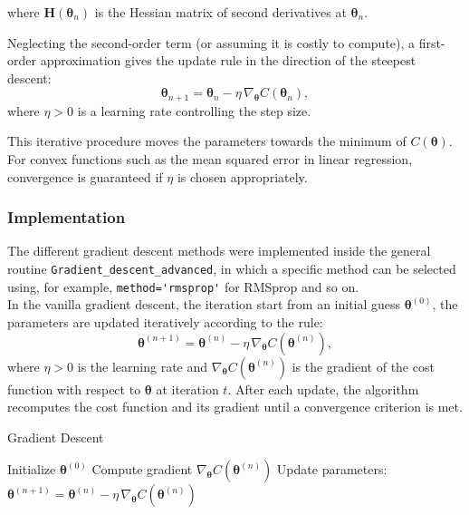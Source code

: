 \documentclass[
 reprint,            %
 amsmath,amssymb,
 aps,
]{revtex4-2}
\begin{document}
where $\mathbf{H}(\boldsymbol{\theta}_n)$ is the Hessian matrix of second derivatives at $\boldsymbol{\theta}_n$.

Neglecting the second-order term (or assuming it is costly to compute), a first-order approximation gives the update rule in the direction of the steepest descent:
\[
\boldsymbol{\theta}_{n+1} = \boldsymbol{\theta}_n - \eta \, \nabla_{\boldsymbol{\theta}} C(\boldsymbol{\theta}_n),
\]
where $\eta > 0$ is a learning rate controlling the step size.  

This iterative procedure moves the parameters towards the minimum of $C(\boldsymbol{\theta})$.
For convex functions such as the mean squared error in linear regression, convergence is guaranteed if $\eta$ is chosen appropriately.

\subsubsection{Implementation}
The different gradient descent methods were implemented inside the general routine \verb|Gradient_descent_advanced|, in which a specific method can be selected using, for example, \verb|method='rmsprop'| for RMSprop and so on. \\
In the vanilla gradient descent, the iteration start from an initial guess $\boldsymbol{\theta}^{(0)}$, the parameters are updated iteratively according to the rule:
\[
\boldsymbol{\theta}^{(n+1)} = \boldsymbol{\theta}^{(n)} - \eta \, \nabla_{\boldsymbol{\theta}} C(\boldsymbol{\theta}^{(n)}),
\]
where $\eta > 0$ is the learning rate and $\nabla_{\boldsymbol{\theta}} C(\boldsymbol{\theta}^{(n)})$ is the gradient of the cost function with respect to $\boldsymbol{\theta}$ at iteration $t$.
After each update, the algorithm recomputes the cost function and its gradient until a convergence criterion is met.\\

\begin{algorithm}[H]
\caption{Gradient Descent}
\begin{algorithmic}[1]
\State Initialize $\boldsymbol{\theta}^{(0)}$
    \State Compute gradient $\nabla_{\boldsymbol{\theta}} C(\boldsymbol{\theta}^{(n)})$
    \State Update parameters: 
    $\boldsymbol{\theta}^{(n+1)} = \boldsymbol{\theta}^{(n)} - \eta \, \nabla_{\boldsymbol{\theta}} C(\boldsymbol{\theta}^{(n)})$
\EndFor
\end{algorithmic}
\end{algorithm}
\end{document}
